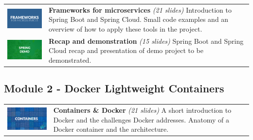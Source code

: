 \newpage

\noindent\begin{tabular}{p{6cm}p{7.5cm}}
\includegraphics[align=t,width=6cm]{figures/slides/slides_w1_spring_cloud} & \textbf{Frameworks for microservices} \newline \textit{(21 slides)} \newline Introduction to Spring Boot and Spring Cloud. Small code examples and an overview of how to apply these tools in the project. \\ 

\includegraphics[align=t,width=6cm]{figures/slides/slides_w1_demo} & \textbf{Recap and demonstration} \newline \textit{(15 slides)} \newline Spring Boot and Spring Cloud recap and presentation of demo project to be demonstrated. \\ 
\end{tabular}

\subsection*{Module 2 - Docker Lightweight Containers}

\renewcommand*{\arraystretch}{2}
\begin{tabular}{p{6cm}p{7.5cm}}

\includegraphics[align=t,width=6cm]{figures/slides/slides_w2_containers_docker} & \textbf{Containers \& Docker} \newline \textit{(21 slides)} \newline A short introduction to Docker and the challenges Docker addresses. Anatomy of a Docker container and the architecture.  \\ 

\end{tabular}


